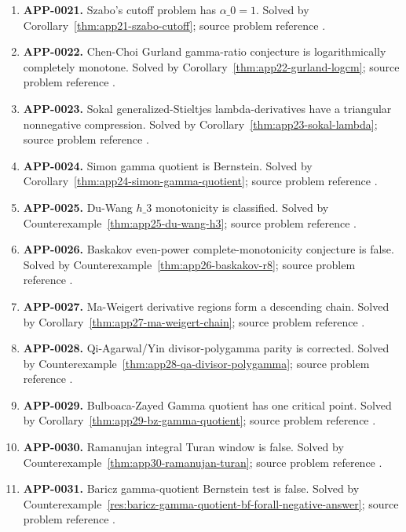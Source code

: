 \documentclass[11pt]{article}
\numberwithin{equation}{section}
\theoremstyle{definition}
\theoremstyle{remark}
\newcommand{\1}{\mathbf 1}
\begin{document}
\begin{enumerate}
\item \label{ledger:app-0021}\textbf{APP-0021.} Szabo's cutoff problem has \(\alpha\_0=1\). Solved by Corollary~\ref{thm:app21-szabo-cutoff}; source problem reference \cite{szabo-cm}.
\item \label{ledger:app-0022}\textbf{APP-0022.} Chen-Choi Gurland gamma-ratio conjecture is logarithmically completely monotone. Solved by Corollary~\ref{thm:app22-gurland-logcm}; source problem reference \cite{chen-choi-gurland}.
\item \label{ledger:app-0023}\textbf{APP-0023.} Sokal generalized-Stieltjes lambda-derivatives have a triangular nonnegative compression. Solved by Corollary~\ref{thm:app23-sokal-lambda}; source problem reference \cite{sokal-gs}.
\item \label{ledger:app-0024}\textbf{APP-0024.} Simon gamma quotient is Bernstein. Solved by Corollary~\ref{thm:app24-simon-gamma-quotient}; source problem reference \cite{simon-moment}.
\item \label{ledger:app-0025}\textbf{APP-0025.} Du-Wang \(h\_3\) monotonicity is classified. Solved by Counterexample~\ref{thm:app25-du-wang-h3}; source problem reference \cite{du-wang-h3}.
\item \label{ledger:app-0026}\textbf{APP-0026.} Baskakov even-power complete-monotonicity conjecture is false. Solved by Counterexample~\ref{thm:app26-baskakov-r8}; source problem reference \cite{abel-gawronski-neuschel}.
\item \label{ledger:app-0027}\textbf{APP-0027.} Ma-Weigert derivative regions form a descending chain. Solved by Corollary~\ref{thm:app27-ma-weigert-chain}; source problem reference \cite{ma-weigert-log-functions}.
\item \label{ledger:app-0028}\textbf{APP-0028.} Qi-Agarwal/Yin divisor-polygamma parity is corrected. Solved by Counterexample~\ref{thm:app28-qa-divisor-polygamma}; source problem reference \cite{qi-agarwal-gamma-ratios}.
\item \label{ledger:app-0029}\textbf{APP-0029.} Bulboaca-Zayed Gamma quotient has one critical point. Solved by Corollary~\ref{thm:app29-bz-gamma-quotient}; source problem reference \cite{bulboaca-zayed-gamma}.
\item \label{ledger:app-0030}\textbf{APP-0030.} Ramanujan integral Turan window is false. Solved by Counterexample~\ref{thm:app30-ramanujan-turan}; source problem reference \cite{mishra-swaminathan-ramanujan}.
\item \label{ledger:app-0031}\textbf{APP-0031.} Baricz gamma-quotient Bernstein test is false. Solved by Counterexample~\ref{res:baricz-gamma-quotient-bf-forall-negative-answer}; source problem reference \cite{baricz-turan}.

\end{enumerate}
\end{document}
